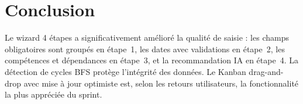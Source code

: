 \section*{Conclusion}
Le wizard 4 étapes a significativement amélioré la qualité de saisie : les champs
obligatoires sont groupés en étape~1, les dates avec validations en étape~2, les
compétences et dépendances en étape~3, et la recommandation IA en étape~4. La
détection de cycles BFS protège l'intégrité des données. Le Kanban drag-and-drop
avec mise à jour optimiste est, selon les retours utilisateurs, la fonctionnalité
la plus appréciée du sprint.
